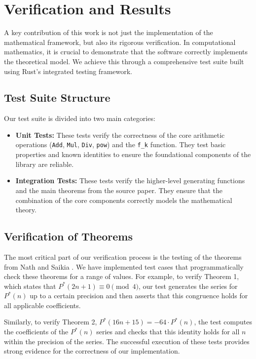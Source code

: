 \documentclass{article}
\begin{document}
\section{Verification and Results}

A key contribution of this work is not just the implementation of the mathematical framework, but also its rigorous verification. In computational mathematics, it is crucial to demonstrate that the software correctly implements the theoretical model. We achieve this through a comprehensive test suite built using Rust's integrated testing framework.

\subsection{Test Suite Structure}

Our test suite is divided into two main categories:
\begin{itemize}
    \item \textbf{Unit Tests:} These tests verify the correctness of the core arithmetic operations (\texttt{Add}, \texttt{Mul}, \texttt{Div}, \texttt{pow}) and the \texttt{f\_k} function. They test basic properties and known identities to ensure the foundational components of the library are reliable.
    \item \textbf{Integration Tests:} These tests verify the higher-level generating functions and the main theorems from the source paper. They ensure that the combination of the core components correctly models the mathematical theory.
\end{itemize}

\subsection{Verification of Theorems}

The most critical part of our verification process is the testing of the theorems from Nath and Saikia \cite{nath2025arithmetic}. We have implemented test cases that programmatically check these theorems for a range of values. For example, to verify Theorem 1, which states that $P^*(2n+1) \equiv 0 \pmod{4}$, our test generates the series for $P^*(n)$ up to a certain precision and then asserts that this congruence holds for all applicable coefficients.

Similarly, to verify Theorem 2, $P^*(16n+15) = -64 \cdot P^*(n)$, the test computes the coefficients of the $P^*(n)$ series and checks that this identity holds for all $n$ within the precision of the series. The successful execution of these tests provides strong evidence for the correctness of our implementation.
\end{document}
